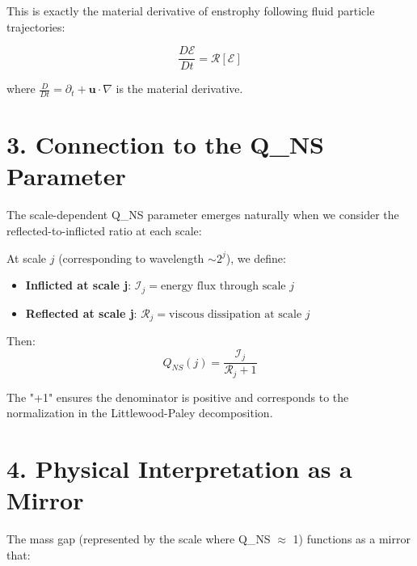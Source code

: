 \documentclass[11pt]{article}
\begin{document}
This is exactly the material derivative of enstrophy following fluid particle trajectories:

\[
\frac{D\mathcal{E}}{Dt} = \mathcal{R}[\mathcal{E}]
\]

where \(\frac{D}{Dt} = \partial_t + \mathbf{u} \cdot \nabla\) is the material derivative.

\section{3. Connection to the Q_{NS} Parameter}

The scale-dependent Q_{NS} parameter emerges naturally when we consider the reflected-to-inflicted ratio at each scale:

At scale \(j\) (corresponding to wavelength \(\sim 2^j\)), we define:

\begin{itemize}
\item \textbf{Inflicted at scale j}: \(\mathcal{I}_j = \text{energy flux through scale } j\)
\item \textbf{Reflected at scale j}: \(\mathcal{R}_j = \text{viscous dissipation at scale } j\)
\end{itemize}

Then:
\[
Q_{NS}(j) = \frac{\mathcal{I}_j}{\mathcal{R}_j + 1}
\]

The "+1" ensures the denominator is positive and corresponds to the normalization in the Littlewood-Paley decomposition.

\section{4. Physical Interpretation as a Mirror}

The mass gap (represented by the scale where Q_{NS} \(\approx\) 1) functions as a mirror that:
\end{document}
